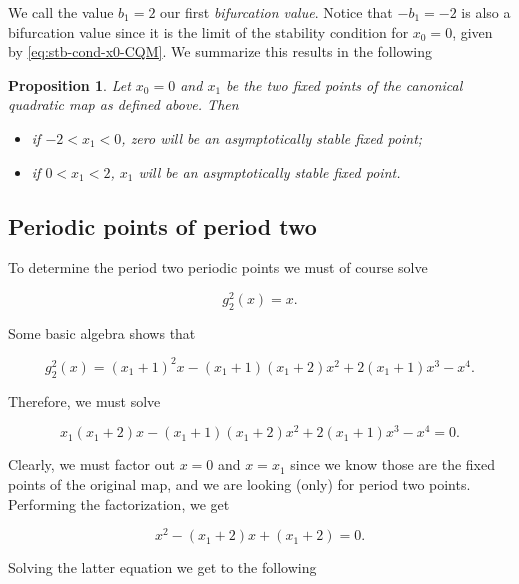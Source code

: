 \documentclass[10pt,twoside,titlepage]{book}
\numberwithin{equation}{chapter}
\numberwithin{figure}{chapter}
\numberwithin{table}{chapter}
\theoremstyle{plain}%
\newtheorem{prop}[thm]{Proposition}
\theoremstyle{definition}
\theoremstyle{remark}
\begin{document}
We call the value $b_1=2$ our first \emph{bifurcation value}. Notice that $-b_1=-2$ is also a bifurcation value since it is the limit of the stability condition for $x_0=0$, given by \eqref{eq:stb-cond-x0-CQM}. We summarize this results in the following

\begin{prop}
	Let $x_0=0$ and $x_1$ be the two fixed points of the canonical quadratic map as defined above. Then
	\begin{itemize}
		\item if $-2<x_1<0$, zero will be an asymptotically stable fixed point;
		\item if $0<x_1<2$, $x_1$ will be an asymptotically stable fixed point.
	\end{itemize}
\end{prop}

\subsection{Periodic points of period two}

To determine the period two periodic points we must of course solve

\begin{equation*}
	g_2^2(x)=x.
\end{equation*}

Some basic algebra shows that

\begin{equation*}
	g_2^2(x)=(x_1+1)^2 x-(x_1+1)(x_1+2)x^2+2(x_1+1)x^3-x^4.
\end{equation*}

Therefore, we must solve

\begin{equation*}
	x_1(x_1+2) x-(x_1+1)(x_1+2)x^2+2(x_1+1)x^3-x^4=0.
\end{equation*}

Clearly, we must factor out $x=0$ and $x=x_1$ since we know those are the fixed points of the original map, and we are looking (only) for period two points. Performing the factorization, we get

\begin{equation}
	\label{eq:CQM-per2eq}
	x^2-(x_1+2)x+(x_1+2)=0.
\end{equation}

Solving the latter equation we get to the following
\end{document}

